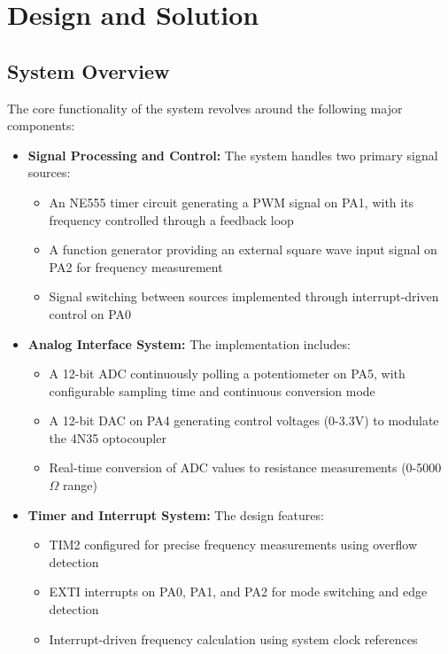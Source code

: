 \section{Design and Solution}
\subsection{System Overview}
The core functionality of the system revolves around the following major components:

\begin{itemize}
    \item \textbf{Signal Processing and Control:} The system handles two primary signal sources:
    \begin{itemize}
        \item An NE555 timer circuit generating a PWM signal on PA1, with its frequency controlled through a feedback loop
        \item A function generator providing an external square wave input signal on PA2 for frequency measurement
        \item Signal switching between sources implemented through interrupt-driven control on PA0
    \end{itemize}

    \item \textbf{Analog Interface System:} The implementation includes:
    \begin{itemize}
        \item A 12-bit ADC continuously polling a potentiometer on PA5, with configurable sampling time and continuous conversion mode
        \item A 12-bit DAC on PA4 generating control voltages (0-3.3V) to modulate the 4N35 optocoupler
        \item Real-time conversion of ADC values to resistance measurements (0-5000~$\Omega$ range)
    \end{itemize}

    \item \textbf{Timer and Interrupt System:} The design features:
    \begin{itemize}
        \item TIM2 configured for precise frequency measurements using overflow detection
        \item EXTI interrupts on PA0, PA1, and PA2 for mode switching and edge detection
        \item Interrupt-driven frequency calculation using system clock references
    \end{itemize}


\end{itemize}
